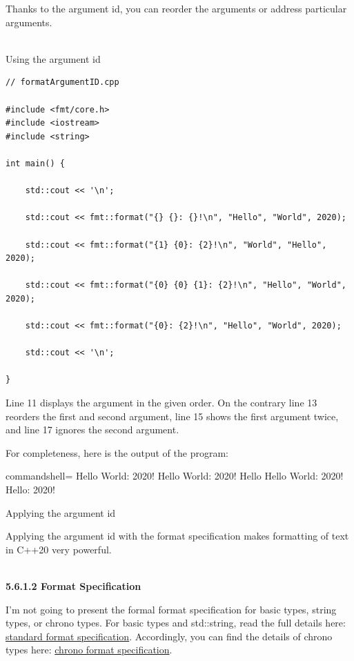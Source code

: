 Thanks to the argument id, you can reorder the arguments or address particular arguments.

\hspace*{\fill} \\ %
\noindent
Using the argument id
\begin{lstlisting}[style=styleCXX]
// formatArgumentID.cpp

#include <fmt/core.h>
#include <iostream>
#include <string>

int main() {
	
	std::cout << '\n';
	
	std::cout << fmt::format("{} {}: {}!\n", "Hello", "World", 2020);
	
	std::cout << fmt::format("{1} {0}: {2}!\n", "World", "Hello", 2020);
	
	std::cout << fmt::format("{0} {0} {1}: {2}!\n", "Hello", "World", 2020);
	
	std::cout << fmt::format("{0}: {2}!\n", "Hello", "World", 2020);
	
	std::cout << '\n';

}
\end{lstlisting}

Line 11 displays the argument in the given order. On the contrary line 13 reorders the first and second argument, line 15 shows the first argument twice, and line 17 ignores the second argument.

For completeness, here is the output of the program:

\begin{tcblisting}{commandshell={}}
Hello World: 2020!
Hello World: 2020!
Hello Hello World: 2020!
Hello: 2020!
\end{tcblisting}

\begin{center}
Applying the argument id
\end{center}

Applying the argument id with the format specification makes formatting of text in C++20 very powerful.

\hspace*{\fill} \\ %
\noindent
\textbf{5.6.1.2\hspace{0.2cm} Format Specification}

I’m not going to present the formal format specification for basic types, string types, or chrono types. For basic types and std::string, read the full details here: \href{https://en.cppreference.com/w/cpp/utility/format/formatter#Standard_format_specification}{standard format specification}. Accordingly, you can find the details of chrono types here: \href{https://en.cppreference.com/w/cpp/chrono/system_clock/formatter#Format_specification}{chrono format specification}.

